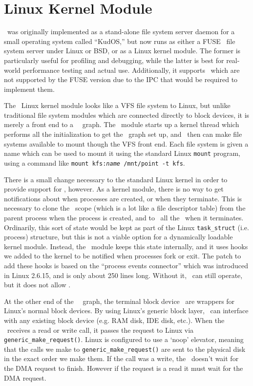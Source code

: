 \section{Linux Kernel Module}
\label{sec:linux}

\Kudos\ was originally implemented as a stand-alone file system server daemon
for a small operating system called ``KudOS,'' but now runs as either a
FUSE~\cite{fuse} file system server under Linux or BSD, or as a Linux kernel
module. The former is particularly useful for profiling and debugging, while the
latter is best for real-world performance testing and actual use. Additionally,
it supports \opgroups\ which are not supported by the FUSE version due to the
IPC that would be required to implement them.

The \Kudos\ Linux kernel module looks like a VFS file system to Linux, but
unlike traditional file system modules which are connected directly to block
devices, it is merely a front end to a \Kudos\ \module\ graph. The \Kudos{}tarts up a kernel thread which performs all the initialization to get
the \module\ graph set up, and \modules\ then can make file systems available to
mount though the VFS front end. Each file system is given a name which can be
used to mount it using the standard Linux \texttt{mount} program, using a
command like \mbox{\texttt{mount kfs:\textit{name} /mnt/point -t kfs}}.

There is a small change necessary to the standard Linux kernel in order to
provide support for \opgroups, however. As a kernel module, there is no way to
get notifications about when processes are created, or when they terminate. This
is necessary to clone the \opgroup\ scope (which is a lot like a file descriptor
table) from the parent process when the process is created, and to \abandon\ all
the \opgroups\ when it terminates. Ordinarily, this sort of state would be kept
as part of the Linux \texttt{task\_struct} (i.e. process) structure, but this is
not a viable option for a dynamically loadable kernel module. Instead, the
\Kudos\ module keeps this state internally, and it uses hooks we added to the
kernel to be notified when processes fork or exit. The patch to add these hooks
is based on the ``process events connector'' which was introduced in Linux
2.6.15, and is only about 250 lines long. Without it, \Kudos\ can still operate,
but it does not allow \opgroups.

At the other end of the \Kudos\ \module\ graph, the terminal block device
\modules\ are wrappers for Linux's normal block devices. By using Linux's
generic block layer, \Kudos\ can interface with any existing block device (e.g.
RAM disk, IDE disk, etc.). When the \module\ receives a read or write call, it
passes the request to Linux via \texttt{generic\_make\_request()}. Linux is
configured to use a `noop' elevator, meaning that the calls we make to
\texttt{generic\_make\_request()} are sent to the physical disk in the exact
order we make them. If the call was a write, the \module\ doesn't wait for the
DMA request to finish. However if the request is a read it must wait for the DMA
request.

